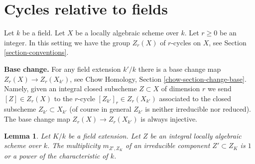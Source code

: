 \documentclass{stacks-project}
\theoremstyle{plain}
\newtheorem{lemma}[subsection]{Lemma}
\theoremstyle{definition}
\theoremstyle{remark}
\numberwithin{equation}{subsection}
\begin{document}
\section{Cycles relative to fields}
\label{section-relative-fields}

\noindent
Let $k$ be a field. Let $X$ be a locally algebraic scheme over $k$.
Let $r \geq 0$ be an integer. In this setting we have the group
$Z_r(X)$ of $r$-cycles on $X$, see Section \ref{section-conventions}.

\medskip\noindent
{\bf Base change.} For any field extension $k'/k$ there is a base change
map $Z_r(X) \to Z_r(X_{k'})$, see
Chow Homology, Section \ref{chow-section-change-base}.
Namely, given an integral closed subscheme $Z \subset X$
of dimension $r$ we send $[Z] \in Z_r(X)$ to the $r$-cycle
$[Z_{k'}]_r \in Z_r(X_{k'})$ associated to the closed subscheme
$Z_{k'} \subset X_{k'}$ (of course in general $Z_{k'}$
is neither irreducible nor reduced). The base change map
$Z_r(X) \to Z_r(X_{k'})$ is always injective.

\begin{lemma}
\label{lemma-multiplicities-field-extension}
Let $K/k$ be a field extension. Let $Z$ be an integral locally algebraic
scheme over $k$. The multiplicity $m_{Z', Z_K}$ of an irreducible
component $Z' \subset Z_K$ is $1$ or a power of the characteristic of $k$.
\end{lemma}
\end{document}
